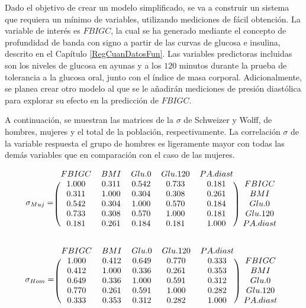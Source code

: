 Dado el objetivo de crear un modelo simplificado, se va a construir un sistema que requiera un mínimo de variables, utilizando mediciones de fácil obtención. La variable de interés es $FBIGC$, la cual se ha generado mediante el concepto de profundidad de banda con signo a partir de las curvas de glucosa e insulina, descrito en el Capítulo \ref{RegCuanDatosFun}. Las variables predictoras incluidas son los niveles de glucosa en ayunas y a los $120$ minutos durante la prueba de tolerancia a la glucosa oral, junto con el índice de masa corporal. Adicionalmente, se planea crear otro modelo al que se le añadirán mediciones de presión diastólica para explorar su efecto en la predicción de $FBIGC$.

A continuación, se muestran las matrices de la $\sigma$ de Schweizer y Wolff, de hombres, mujeres y el total de la población, respectivamente. La correlación $\sigma$ de la variable respuesta el grupo de hombres es ligeramente mayor con todas las demás variables que en comparación con el caso de las mujeres.

\[
\sigma_{Muj} = \begin{blockarray}{cccccc}
FBIGC      &      BMI      &    Glu.0      &  Glu.120      & PA.diast \\
\begin{block}{(ccccc)c}
1.000 & 0.311 & 0.542 &  0.733 & 0.181 & FBIGC \\
0.311 & 1.000 & 0.304 &  0.308 & 0.261 & BMI \\
0.542 & 0.304 & 1.000 &  0.570 & 0.184 & Glu.0 \\
0.733 & 0.308 & 0.570 &  1.000 & 0.181 & Glu.120 \\
0.181 & 0.261 & 0.184 &  0.181 & 1.000 & PA.diast \\
\end{block}
\end{blockarray}
 \]

\[
\sigma_{Hom} = \begin{blockarray}{cccccc}
FBIGC      &      BMI      &    Glu.0      &  Glu.120      & PA.diast \\
\begin{block}{(ccccc)c}
1.000 & 0.412 & 0.649 & 0.770 & 0.333 & FBIGC \\
0.412 & 1.000 & 0.336 & 0.261 & 0.353 & BMI \\
0.649 & 0.336 & 1.000 & 0.591 & 0.312 & Glu.0 \\
0.770 & 0.261 & 0.591 & 1.000 & 0.282 & Glu.120\\
0.333 & 0.353 & 0.312 & 0.282 & 1.000 & PA.diast \\
\end{block}
\end{blockarray}
 \]


